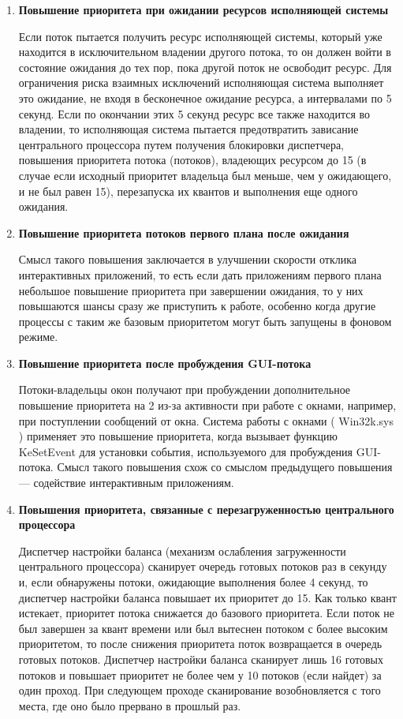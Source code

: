 \begin{enumerate}[label={\arabic*.}]
	
	\item \textbf{Повышение приоритета при ожидании ресурсов исполняющей системы}
	
	Если поток пытается получить ресурс исполняющей системы, который уже находится в исключительном владении другого потока, то он должен войти в состояние ожидания до тех пор, пока другой поток не освободит ресурс. Для ограничения риска взаимных исключений исполняющая система выполняет это ожидание, не входя в бесконечное ожидание ресурса, а интервалами по 5 секунд. Если по окончании этих 5 секунд ресурс все также находится во владении, то исполняющая система пытается предотвратить зависание центрального процессора путем получения блокировки диспетчера, повышения приоритета потока (потоков), владеющих ресурсом до 15 (в случае если исходный приоритет владельца был меньше, чем у ожидающего, и не был равен 15), перезапуска их квантов и выполнения еще одного ожидания.
	
	\clearpage
	
	\item \textbf{Повышение приоритета потоков первого плана после ожидания}
	
	Смысл такого повышения заключается в улучшении скорости отклика интерактивных приложений, то есть если дать приложениям первого плана небольшое повышение	приоритета при завершении ожидания, то у них повышаются шансы сразу же приступить к работе, особенно когда другие процессы с таким же базовым приоритетом	могут быть запущены в фоновом режиме.
	
	\item \textbf{Повышение приоритета после пробуждения GUI-потока}
	
	Потоки-владельцы окон получают при пробуждении дополнительное повышение приоритета на 2 из-за активности при работе с окнами, например, при поступлении сообщений от окна. Система работы с окнами ( Win32k.sys ) применяет это повышение приоритета, когда вызывает функцию KeSetEvent для установки события, используемого для пробуждения GUI-потока. Смысл такого повышения схож со смыслом 		предыдущего повышения — содействие интерактивным приложениям.
	
	\item \textbf{Повышения приоритета, связанные с перезагруженностью центрального процессора}
	
	Диспетчер настройки баланса (механизм ослабления загруженности центрального процессора) сканирует очередь готовых потоков раз в секунду и, если обнаружены потоки, ожидающие выполнения более 4 секунд, то диспетчер настройки баланса повышает их приоритет до 15. Как только квант истекает, приоритет потока снижается до базового приоритета. Если поток не был завершен за квант времени или был вытеснен потоком с более высоким приоритетом, то после снижения 		приоритета поток возвращается в очередь готовых потоков. Диспетчер настройки баланса сканирует лишь 16 готовых потоков и повышает приоритет не более чем у 10 потоков (если найдет) за один проход. При следующем проходе сканирование возобновляется	с того места, где оно было прервано в прошлый раз. 
	\clearpage
	

\end{enumerate}
